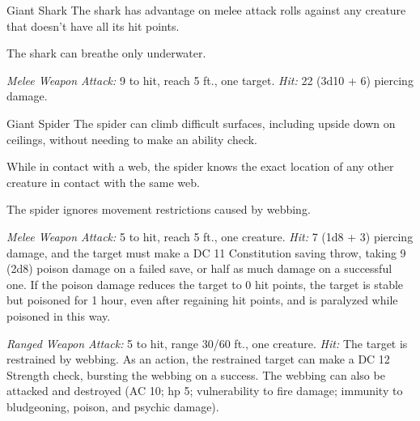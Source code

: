 \documentclass[10pt,a4paper,twoside,bg=print,twocolumn,openany,nodeprecatedcode]{dndbook}
\begin{document}
\begin{DndMonster}[float=t]{Giant Shark}
\DndMonsterBasics[
armor-class = {13 (natural armor)},
hit-points = {\DndDice{11d12 + 55}},
speed = {0 ft., swim 50 ft.}
]
\DndMonsterAbilityScores[
 str = 23,
 dex = 11,
 con = 21,
 int = 1,
 wis = 10,
 cha = 5
]
\DndMonsterDetails[
skills = {Perception +3},
senses = {blindsight 60 ft., passive perception 13},
challenge = 5,
]
The shark has advantage on melee attack rolls against any creature that doesn't have all its hit points.

The shark can breathe only underwater.

\textsl{Melee Weapon Attack:} 9 to hit, reach 5 ft., one target. \textsl{Hit:} 22 (3d10 + 6) piercing damage.

\end{DndMonster}



\begin{DndMonster}[float=t]{Giant Spider}
\DndMonsterBasics[
armor-class = {14 (natural armor)},
hit-points = {\DndDice{4d10 + 4}},
speed = {30 ft., climb 30 ft.}
]
\DndMonsterAbilityScores[
 str = 14,
 dex = 16,
 con = 12,
 int = 2,
 wis = 11,
 cha = 4
]
\DndMonsterDetails[
skills = {Stealth +7},
senses = {blindsight 10 ft., darkvision 60 ft., passive perception 10},
challenge = 1,
]
The spider can climb difficult surfaces, including upside down on ceilings, without needing to make an ability check.

While in contact with a web, the spider knows the exact location of any other creature in contact with the same web.

The spider ignores movement restrictions caused by webbing.

\textsl{Melee Weapon Attack:} 5 to hit, reach 5 ft., one creature. \textsl{Hit:} 7 (1d8 + 3) piercing damage, and the target must make a DC 11 Constitution saving throw, taking 9 (2d8) poison damage on a failed save, or half as much damage on a successful one. If the poison damage reduces the target to 0 hit points, the target is stable but poisoned for 1 hour, even after regaining hit points, and is paralyzed while poisoned in this way.

\textsl{Ranged Weapon Attack:} 5 to hit, range 30/60 ft., one creature. \textsl{Hit:} The target is restrained by webbing. As an action, the restrained target can make a DC 12 Strength check, bursting the webbing on a success. The webbing can also be attacked and destroyed (AC 10; hp 5; vulnerability to fire damage; immunity to bludgeoning, poison, and psychic damage).

\end{DndMonster}
\end{document}
